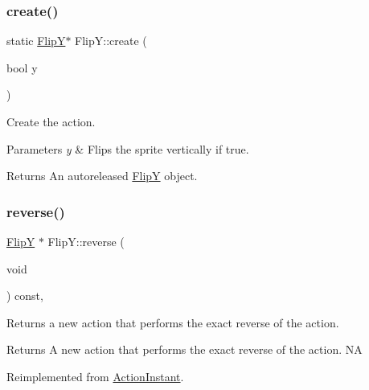 \subsubsection{\texorpdfstring{create()}{create()}\hspace{0.1cm}{\footnotesize\ttfamily [2/2]}}
{\footnotesize\ttfamily static \hyperlink{classFlipY}{FlipY}$\ast$ Flip\+Y\+::create (\begin{DoxyParamCaption}\item[{bool}]{y }\end{DoxyParamCaption})\hspace{0.3cm}{\ttfamily [static]}}

Create the action.


\begin{DoxyParams}{Parameters}
{\em y} & Flips the sprite vertically if true. \\
\hline
\end{DoxyParams}
\begin{DoxyReturn}{Returns}
An autoreleased \hyperlink{classFlipY}{FlipY} object. 
\end{DoxyReturn}
\mbox{\label{classFlipY_a41c7c49f5a9cac8f174ce8eb79eb4d0d}} 
\subsubsection{\texorpdfstring{reverse()}{reverse()}\hspace{0.1cm}{\footnotesize\ttfamily [1/2]}}
{\footnotesize\ttfamily \hyperlink{classFlipY}{FlipY} $\ast$ Flip\+Y\+::reverse (\begin{DoxyParamCaption}\item[{void}]{ }\end{DoxyParamCaption}) const\hspace{0.3cm}{\ttfamily [override]}, {\ttfamily [virtual]}}

Returns a new action that performs the exact reverse of the action.

\begin{DoxyReturn}{Returns}
A new action that performs the exact reverse of the action.  NA 
\end{DoxyReturn}


Reimplemented from \hyperlink{classActionInstant_aeb1870802c509e1f4111c863a28e9262}{Action\+Instant}.

\mbox{\label{classFlipY_a1b49c042ac0ac7036ed1447f725e091d}} 
